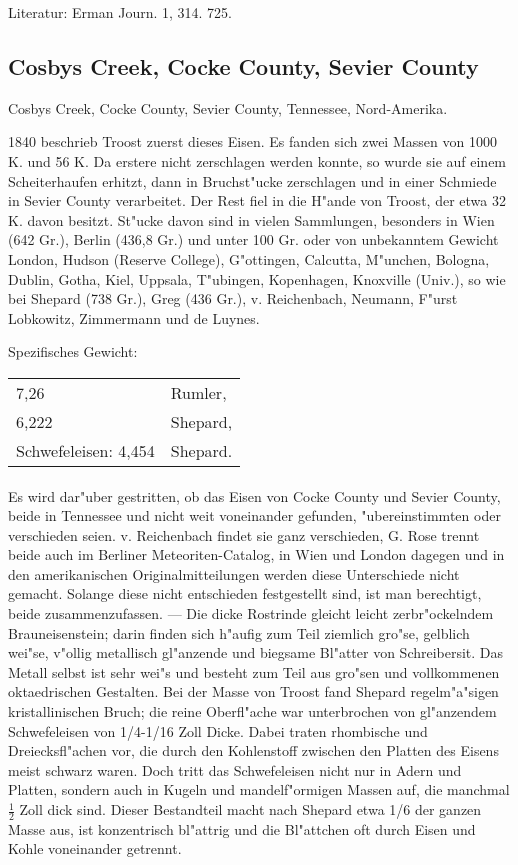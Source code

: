\documentclass[a4paper, 11pt, oneside]{article}
\begin{document}
Literatur: Erman Journ. 1, 314. 725.

\subsection{Cosbys Creek, Cocke County, Sevier County}

Cosbys Creek, Cocke County, Sevier County, Tennessee, Nord-Amerika.

1840 beschrieb Troost zuerst dieses Eisen. Es fanden sich zwei Massen von 1000 K. und 56 K. Da erstere nicht zerschlagen werden konnte, so wurde sie auf einem Scheiterhaufen erhitzt, dann in Bruchst"ucke zerschlagen und in einer Schmiede in Sevier County verarbeitet. Der Rest fiel in die H"ande von Troost, der etwa 32 K. davon besitzt. St"ucke davon sind in vielen Sammlungen, besonders in Wien (642 Gr.), Berlin (436,8 Gr.) und unter 100 Gr. oder von unbekanntem Gewicht London, Hudson (Reserve College), G"ottingen, Calcutta, M"unchen, Bologna, Dublin, Gotha, Kiel, Uppsala, T"ubingen, Kopenhagen, Knoxville (Univ.), so wie bei Shepard (738 Gr.), Greg (436 Gr.), v. Reichenbach, Neumann, F"urst Lobkowitz, Zimmermann und de Luynes.

Spezifisches Gewicht:  
\begin{table}[!ht]
    \centering
    \begin{tabular}{l l}
        7,26 & Rumler,\\
        6,222 & Shepard,\\
        Schwefeleisen: 4,454 & Shepard.
    \end{tabular}
\end{table}
\paragraph{}
Es wird dar"uber gestritten, ob das Eisen von Cocke County und Sevier County, beide in Tennessee und nicht weit voneinander gefunden, "ubereinstimmten oder verschieden seien. v. Reichenbach findet sie ganz verschieden, G. Rose trennt beide auch im Berliner Meteoriten-Catalog, in Wien und London dagegen und in den amerikanischen Originalmitteilungen werden diese Unterschiede nicht gemacht. Solange diese nicht entschieden festgestellt sind, ist man berechtigt, beide zusammenzufassen. --- Die dicke Rostrinde gleicht leicht zerbr"ockelndem Brauneisenstein; darin finden sich h"aufig zum Teil ziemlich gro"se, gelblich wei"se, v"ollig metallisch gl"anzende und biegsame Bl"atter von Schreibersit. Das Metall selbst ist sehr wei"s und besteht zum Teil aus gro"sen und vollkommenen oktaedrischen Gestalten. Bei der Masse von Troost fand Shepard regelm"a"sigen kristallinischen Bruch; die reine Oberfl"ache war unterbrochen von gl"anzendem Schwefeleisen von 1/4-1/16 Zoll Dicke. Dabei traten rhombische und Dreiecksfl"achen vor, die durch den Kohlenstoff zwischen den Platten des Eisens meist schwarz waren. Doch tritt das Schwefeleisen nicht nur in Adern und Platten, sondern auch in Kugeln und mandelf"ormigen Massen auf, die manchmal $\frac{1}{2}$ Zoll dick sind. Dieser Bestandteil macht nach Shepard etwa 1/6 der ganzen Masse aus, ist konzentrisch bl"attrig und die Bl"attchen oft durch Eisen und Kohle voneinander getrennt.
\end{document}
